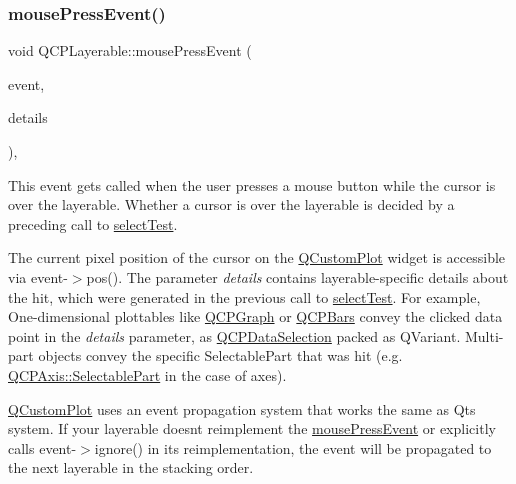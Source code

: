 \mbox{\label{classQCPLayerable_af6567604818db90f4fd52822f8bc8376}} 
\subsubsection{\texorpdfstring{mouse\+Press\+Event()}{mousePressEvent()}}
{\footnotesize\ttfamily void Q\+C\+P\+Layerable\+::mouse\+Press\+Event (\begin{DoxyParamCaption}\item[{Q\+Mouse\+Event $\ast$}]{event,  }\item[{const Q\+Variant \&}]{details }\end{DoxyParamCaption})\hspace{0.3cm}{\ttfamily [protected]}, {\ttfamily [virtual]}}

This event gets called when the user presses a mouse button while the cursor is over the layerable. Whether a cursor is over the layerable is decided by a preceding call to \hyperlink{classQCPLayerable_a04db8351fefd44cfdb77958e75c6288e}{select\+Test}.

The current pixel position of the cursor on the \hyperlink{classQCustomPlot}{Q\+Custom\+Plot} widget is accessible via {\ttfamily event-\/$>$pos()}. The parameter {\itshape details} contains layerable-\/specific details about the hit, which were generated in the previous call to \hyperlink{classQCPLayerable_a04db8351fefd44cfdb77958e75c6288e}{select\+Test}. For example, One-\/dimensional plottables like \hyperlink{classQCPGraph}{Q\+C\+P\+Graph} or \hyperlink{classQCPBars}{Q\+C\+P\+Bars} convey the clicked data point in the {\itshape details} parameter, as \hyperlink{classQCPDataSelection}{Q\+C\+P\+Data\+Selection} packed as Q\+Variant. Multi-\/part objects convey the specific {\ttfamily Selectable\+Part} that was hit (e.\+g. \hyperlink{classQCPAxis_abee4c7a54c468b1385dfce2c898b115f}{Q\+C\+P\+Axis\+::\+Selectable\+Part} in the case of axes).

\hyperlink{classQCustomPlot}{Q\+Custom\+Plot} uses an event propagation system that works the same as Qt\textquotesingle{}s system. If your layerable doesn\textquotesingle{}t reimplement the \hyperlink{classQCPLayerable_af6567604818db90f4fd52822f8bc8376}{mouse\+Press\+Event} or explicitly calls {\ttfamily event-\/$>$ignore()} in its reimplementation, the event will be propagated to the next layerable in the stacking order.

